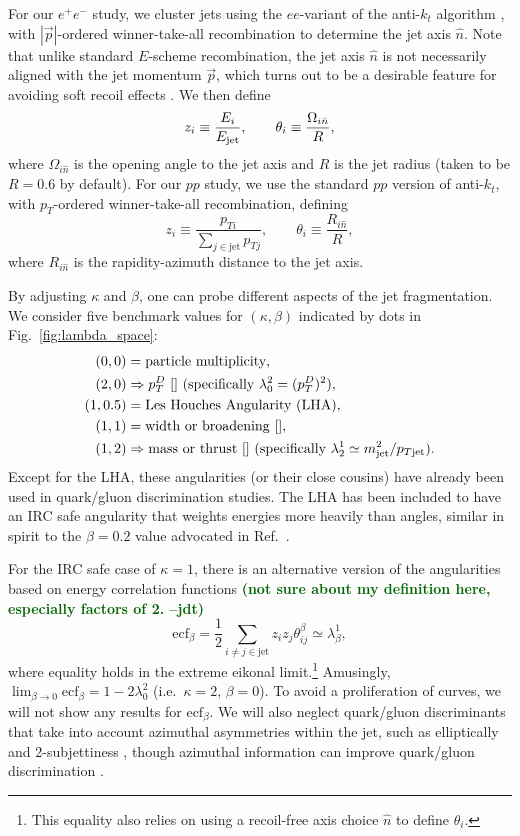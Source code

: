\documentclass[11pt,letterpaper]{article}
\newcommand{\genang}[2]{{\lambda^{#1}_{#2}}}
\DeclareRobustCommand{\Fig}[1]{Fig.~\ref{#1}}
\DeclareRobustCommand{\Ref}[1]{Ref.~\cite{#1}}
\newcommand{\be}{\begin{equation}}
\newcommand{\ee}{\end{equation}}
\newcommand{\jdt}[1]{\textbf{\textcolor{darkgreen}{(#1 --jdt)}}}
\begin{document}
For our $e^+ e^-$ study, we cluster jets using the $ee$-variant of the anti-$k_t$ algorithm \cite{}, with $|\vec{p}|$-ordered winner-take-all recombination \cite{} to determine the jet axis $\hat{n}$.  Note that unlike standard $E$-scheme recombination, the jet axis $\hat{n}$ is not necessarily aligned with the jet momentum $\vec{p}$, which turns out to be a desirable feature for avoiding soft recoil effects \cite{}.  We then define
\be
z_i \equiv \frac{E_i}{E_{\rm jet}}, \qquad \theta_i \equiv \frac{\Omega_{i \hat{n}}}{R},
\ee
where $\Omega_{i \hat{n}}$ is the opening angle to the jet axis and $R$ is the jet radius (taken to be $R = 0.6$ by default).  For our $pp$ study, we use the standard $pp$ version of anti-$k_t$, with $p_T$-ordered winner-take-all recombination, defining
\be
z_i \equiv \frac{p_{Ti}}{\sum_{j \in \text{jet}} p_{Tj}}, \qquad \theta_i \equiv \frac{R_{i \hat{n}}}{R},
\ee
where $R_{i \hat{n}}$ is the rapidity-azimuth distance to the jet axis.

By adjusting $\kappa$ and $\beta$, one can probe different aspects of the jet fragmentation.  We consider five benchmark values for $(\kappa, \beta)$ indicated by dots in \Fig{fig:lambda_space}:
\be
\label{eq:benchmarkang}
\begin{aligned}
(0,0) &= \text{particle multiplicity},\\
(2,0) &\Rightarrow p_T^D \text{  \cite{} (specifically $\genang{2}{0} = (p_T^D)^2$)},\\
(1,0.5) & = \text{Les Houches Angularity (LHA)},\\
(1,1) &= \text{width or broadening \cite{}} ,\\
(1,2) & \Rightarrow \text{mass or thrust \cite{} (specifically $\genang{1}{2} \simeq m_{\rm jet}^2 / p_{T{\rm jet}}$)}.
\end{aligned}
\ee
Except for the LHA, these angularities (or their close cousins) have already been used in quark/gluon discrimination studies.  The LHA has been included to have an IRC safe angularity that weights energies more heavily than angles, similar in spirit to the $\beta = 0.2$ value advocated in \Ref{}.

For the IRC safe case of $\kappa = 1$, there is an alternative version of the angularities based on energy correlation functions \jdt{not sure about my definition here, especially factors of 2.}
\be
\text{ecf}_\beta = \frac{1}{2}\sum_{i \not= j \in \text{jet}} z_i z_j \theta_{ij}^\beta \simeq \genang{1}{\beta},
\ee
where equality holds in the extreme eikonal limit.\footnote{This equality also relies on using a recoil-free axis choice $\hat{n}$ to define $\theta_i$.}  Amusingly, $\lim_{\beta \to 0} \text{ecf}_\beta = 1 - 2 \genang{2}{0}$ \cite{} (i.e.~$\kappa = 2$, $\beta = 0$).  To avoid a proliferation of curves, we will not show any results for $\text{ecf}_\beta$.  We will also neglect quark/gluon discriminants that take into account azimuthal asymmetries within the jet, such as elliptically \cite{} and 2-subjettiness \cite{}, though azimuthal information can improve quark/gluon discrimination \cite{}.
\end{document}
